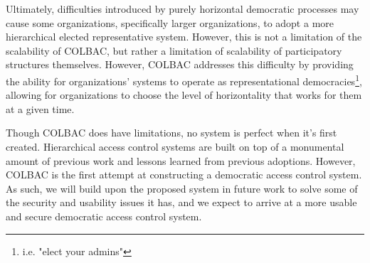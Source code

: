 Ultimately, difficulties introduced by purely horizontal democratic processes
may cause some organizations, specifically larger organizations, to adopt a more
hierarchical elected representative system. However, this is not a limitation of
the scalability of COLBAC, but rather a limitation of scalability of
participatory structures themselves. However, COLBAC addresses this difficulty
by providing the ability for organizations' systems to operate as
representational democracies\footnote{i.e. "elect your admins"}, allowing for
organizations to choose the level of horizontality that works for them at a
given time.

Though COLBAC does have limitations, no system is perfect when it's first
created. Hierarchical access control systems are built on top of a monumental
amount of previous work and lessons learned from previous adoptions. However,
COLBAC is the first attempt at constructing a democratic access control system.
As such, we will build upon the proposed system in future work to solve some of
the security and usability issues it has, and we expect to arrive at a more
usable and secure democratic access control system.
